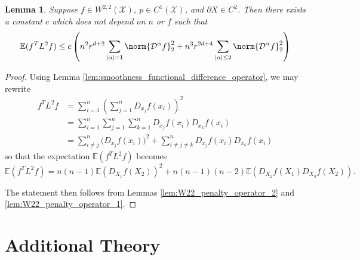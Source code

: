 \documentclass{article}
\newcommand{\abs}[1]{\left \lvert #1 \right \rvert}
\newcommand{\1}{\mathbf{1}}
\newcommand{\domain}{\mathcal{X}}
\newcommand{\Ebb}{\mathbb{E}}
\newcommand{\Partial}{\mathcal{D}}
\theoremstyle{alden}
\theoremstyle{aldenthm}
\newtheorem{lemma}{Lemma}
\theoremstyle{definition}
\theoremstyle{remark}
\begin{document}
\begin{lemma}
	Suppose $f \in W^{2,2}(\mathcal{X})$, $p \in C^1(\domain)$, and $\partial X \in C^2$. Then there exists a constant $c$ which does not depend on $n$ or $f$ such that
	\begin{equation*}
	\Ebb(f^T L^2 f) \leq c \left(n^2 r^{d + 2} \sum_{\abs{\alpha} = 1} \norm{\Partial^{\alpha}f}_2^2  +  n^3 r^{2d + 4} \sum_{\abs{\alpha} \leq 2} \norm{\Partial^{\alpha}f}_2^2 \right)
	\end{equation*}
\end{lemma}
\begin{proof}
	Using Lemma \ref{lem:smoothness_functional_difference_operator}, we may rewrite
	\begin{align*}
	f^T L^2 f & = \sum_{i = 1}^{n} \left(\sum_{j = 1}^{n}D_{x_j}f(x_i)\right)^2 \\
	& = \sum_{i = 1}^{n} \sum_{j = 1}^{n} \sum_{k = 1}^{n} D_{x_j}f(x_i) D_{x_k}f(x_i) \\
	& = \sum_{i \neq j}^{n} \bigl(D_{x_j}f(x_i)\bigr)^2 + \sum_{i \neq j \neq k}^{n} D_{x_j}f(x_i) D_{x_k}f(x_i)
	\end{align*}
	so that the expectation $\Ebb(f^T L^2 f)$ becomes
	\begin{equation*}
	\Ebb(f^T L^2 f) = n(n-1) \Ebb\left(D_{X_1}f(X_2)\right)^2 + n(n-1)(n-2) \Ebb\left(D_{X_2}f(X_1) D_{X_3}f(X_2)\right).
	\end{equation*}
	
	The statement then follows from Lemmas \ref{lem:W22_penalty_operator_2} and \ref{lem:W22_penalty_operator_1}.
\end{proof}

\section{Additional Theory}
\end{document}
